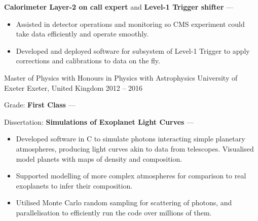 \begin{cventries}
{\begin{cvitems}
            \vpaddingEduNorm
            \item {\textbf{Calorimeter Layer-2 on call expert} and \textbf{Level-1 Trigger shifter} --- }
            \vpaddingEduSubpoint
            \begin{itemize}
                \item[\bullet]{Assisted in detector operations and monitoring so CMS experiment could take data efficiently and operate smoothly.}
                \vpaddingEduSubpoint
                \item[\bullet]{Developed and deployed software for subsystem of Level-1 Trigger to apply corrections and calibrations to data on the fly.}
            \end{itemize}
        \end{cvitems}
        }

    \cventry
        {Master of Physics with Honours in Physics with Astrophysics}
        {University of Exeter}
        {Exeter, United Kingdom}
        {2012 -- 2016}
        {
        \begin{cvitems} %
            \item {Grade: \textbf{First Class} --- }
            \vpaddingEduNorm
            \item {Dissertation: \textbf{Simulations of Exoplanet Light Curves} --- }
            \vpaddingEduSubpoint
            \begin{itemize}
                \item[\bullet]{Developed software in C to simulate photons interacting simple planetary atmospheres, producing light curves akin to data from telescopes. Visualised model planets with maps of density and composition.}
                \vpaddingEduSubpoint
                \item[\bullet]{Supported modelling of more complex atmospheres for comparison to real exoplanets to infer their composition.}
                \vpaddingEduSubpoint
                \item[\bullet]{Utilised Monte Carlo random sampling for scattering of photons, and parallelisation to efficiently run the code over millions of them.}
            \end{itemize}
        \end{cvitems}
        } %


\end{cventries}
